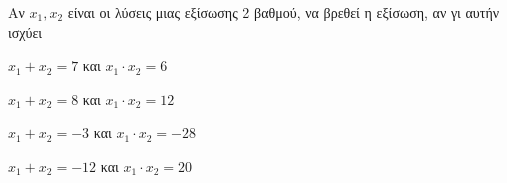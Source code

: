 Αν $ x_1, x_2 $ είναι οι λύσεις μιας εξίσωσης 2 βαθμού, να βρεθεί η εξίσωση, αν γι αυτήν ισχύει
\begin{alist}
\item $ x_1+x_2=7 $ και $ x_1\cdot x_2=6 $
\item $ x_1+x_2=8 $ και $ x_1\cdot x_2=12 $
\item $ x_1+x_2=-3 $ και $ x_1\cdot x_2=-28 $
\item $ x_1+x_2=-12 $ και $ x_1\cdot x_2=20 $
\end{alist}
